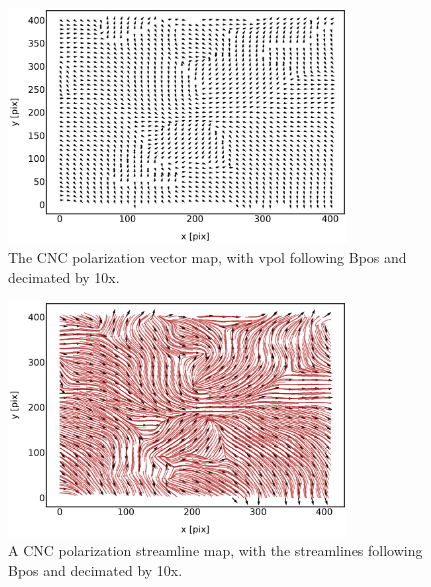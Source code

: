 \begin{figure}[!htbp]
\centering
\includegraphics[width=0.8\textwidth]{figures/carina/vectors_10}
\caption[~The CNC polarization vector map, decimated by 10x.]{The CNC polarization vector map, with \gls{vpol} following \gls{Bpos} and decimated by 10x.}
\label{fig:vectors_10}
\end{figure}

\begin{figure}[!htbp]
\centering
\includegraphics[width=0.8\textwidth]{figures/carina/vector_sl_21_ds10}
\caption[~The CNC polarization-streamline map, with streamlines decimated by 10x.]{A CNC polarization streamline map, with the streamlines following \gls{Bpos} and decimated by 10x.}
\label{fig:vector_sl_21_ds10}
\end{figure}


